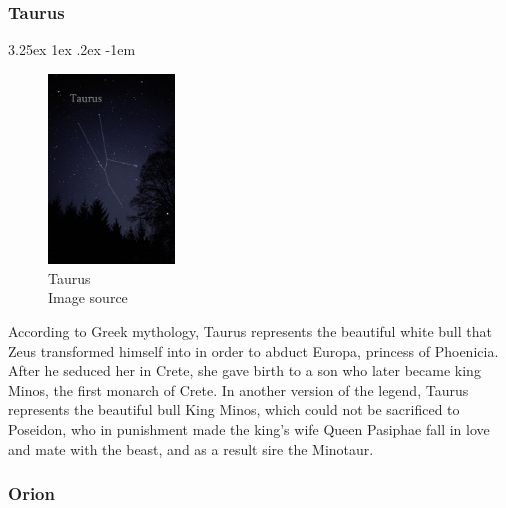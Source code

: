 \documentclass[a4paper,twoside,11pt]{article}
\makeatletter
\numberwithin{equation}{section}
\renewcommand\paragraph{\@startsection{paragraph}{5}{\z@}%
  {3.25ex \@plus1ex \@minus.2ex}%
  {-1em}%
  {\normalfont\normalsize\bfseries}}
\makeatother
\begin{document}
\subsubsection{Taurus}
\paragraph{}
\begin{figure}[h]
\centering
\includegraphics[width=0.3\textwidth]{fig19.jpg}
\caption{Taurus \\ Image source \cite{Tauri}}
\label{fig19}
\end{figure}
According to Greek mythology, Taurus represents the beautiful white bull that Zeus transformed himself into in order to abduct Europa, princess of Phoenicia. After he seduced her in Crete, she gave birth to a son who later became king Minos, the first monarch of Crete. In another version of the legend, Taurus represents the beautiful bull King Minos, which could not be sacrificed to Poseidon, who in punishment made the king’s wife Queen Pasiphae fall in love and mate with the beast, and as a result sire the Minotaur.

\subsubsection{Orion}
\end{document}
